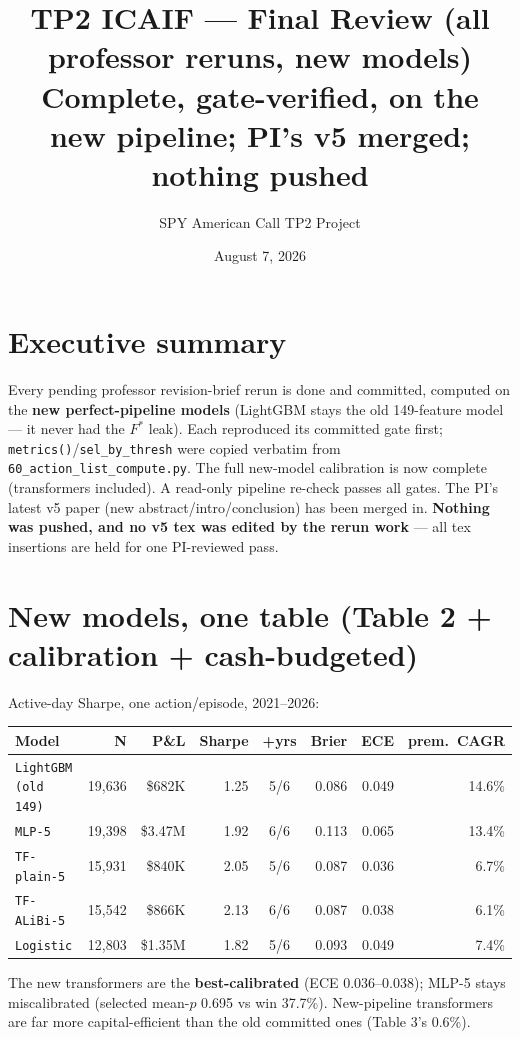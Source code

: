 \documentclass[11pt]{article}
\title{\vspace{-1.2em}TP2 ICAIF --- Final Review (all professor reruns, new models)\\
\large Complete, gate-verified, on the new pipeline; PI's v5 merged; nothing pushed}
\author{SPY American Call TP2 Project}\date{August 7, 2026}
\newcommand{\code}[1]{\texttt{\small #1}}
\begin{document}
\maketitle\vspace{-1.0em}

\section*{Executive summary}
Every pending professor revision-brief rerun is done and committed, computed on the \textbf{new
perfect-pipeline models} (LightGBM stays the old 149-feature model --- it never had the $F^{\ast}$ leak).
Each reproduced its committed gate first; \code{metrics()}/\code{sel\_by\_thresh} were copied verbatim from
\code{60\_action\_list\_compute.py}. The full new-model calibration is now complete (transformers included).
A read-only pipeline re-check passes all gates. The PI's latest v5 paper (new abstract/intro/conclusion) has
been merged in. \textbf{Nothing was pushed, and no v5 tex was edited by the rerun work} --- all tex
insertions are held for one PI-reviewed pass.

\section{New models, one table (Table 2 + calibration + cash-budgeted)}
Active-day Sharpe, one action/episode, 2021--2026:
\begin{center}\footnotesize
\begin{tabular}{l r r r c r r r}
\toprule
Model & N & P\&L & Sharpe & +yrs & Brier & ECE & prem.\ CAGR \\
\midrule
\code{LightGBM (old 149)} & 19,636 & \$682K & 1.25 & 5/6 & 0.086 & 0.049 & 14.6\% \\
\code{MLP-5} & 19,398 & \$3.47M & 1.92 & 6/6 & 0.113 & 0.065 & 13.4\% \\
\code{TF-plain-5} & 15,931 & \$840K & 2.05 & 5/6 & 0.087 & 0.036 & 6.7\% \\
\code{TF-ALiBi-5} & 15,542 & \$866K & 2.13 & 6/6 & 0.087 & 0.038 & 6.1\% \\
\code{Logistic} & 12,803 & \$1.35M & 1.82 & 5/6 & 0.093 & 0.049 & 7.4\% \\
\bottomrule
\end{tabular}
\end{center}
\noindent The new transformers are the \textbf{best-calibrated} (ECE 0.036--0.038); MLP-5 stays miscalibrated
(selected mean-$p$ 0.695 vs win 37.7\%). New-pipeline transformers are far more capital-efficient than the old
committed ones (Table 3's 0.6\%).
\end{document}
